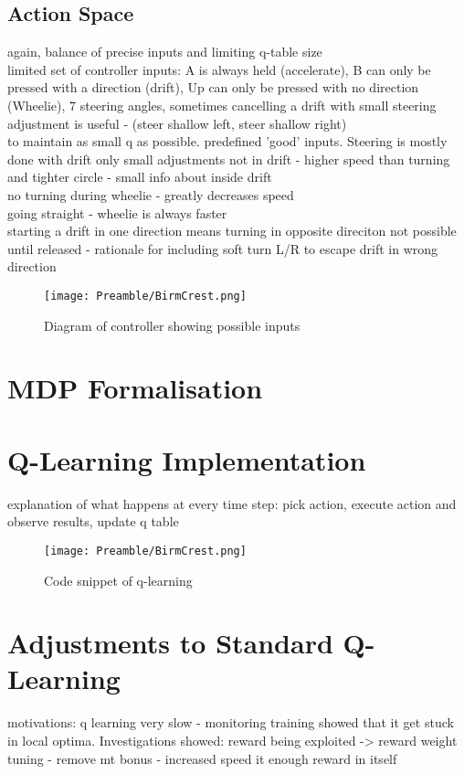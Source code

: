 \subsection{Action Space}
again, balance of precise inputs and limiting q-table size
\\limited set of controller inputs: A is always held (accelerate), B can only be pressed with a direction (drift), Up can only be pressed with no direction (Wheelie), 7 steering angles, sometimes cancelling a drift with small steering adjustment is useful - (steer shallow left, steer shallow right)
\\ to maintain as small q as possible. predefined 'good' inputs. Steering is mostly done with drift only small adjustments not in drift - higher speed than turning and tighter circle - small info about inside drift
\\ no turning during wheelie - greatly decreases speed 
\\ going straight - wheelie is always faster
\\starting a drift in one direction means turning in opposite direciton not possible until released - rationale for including soft turn L/R to escape drift in wrong direction
\begin{figure}
    \centering
    \texttt{[image: Preamble/BirmCrest.png]}
    \caption{Diagram of controller showing possible inputs}
    \label{fig:emulated-controller}
\end{figure}
\section{MDP Formalisation}

\section{Q-Learning Implementation}
explanation of what happens at every time step: pick action, execute action and observe results, update q table
\begin{figure}
    \centering
    \texttt{[image: Preamble/BirmCrest.png]}
    \caption{Code snippet of q-learning}
    \label{fig:q-code-snip}
\end{figure}

\section{Adjustments to Standard Q-Learning}
motivations: q learning very slow - monitoring training showed that it get stuck in local optima. Investigations showed: reward being exploited -> reward weight tuning - remove mt bonus - increased speed it enough reward in itself
